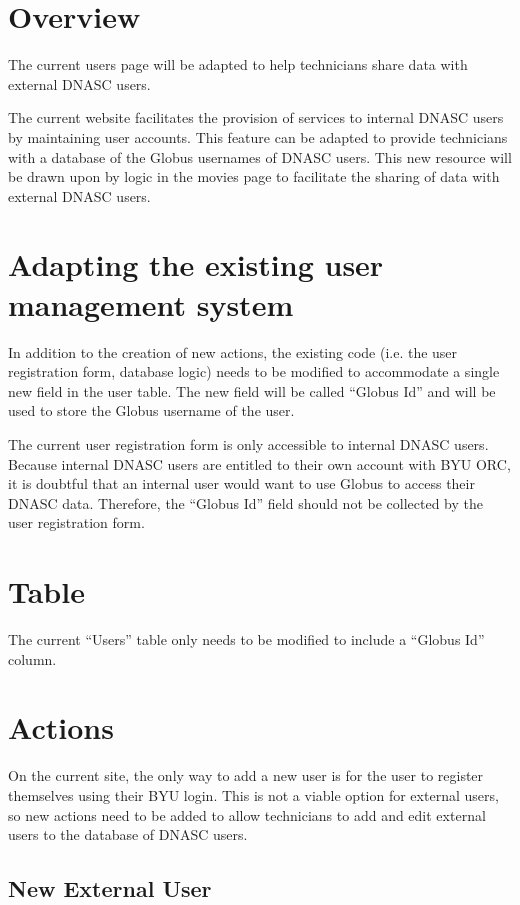 \section{Overview}

The current users page will be adapted to help technicians share data with 
external DNASC users.

The current website facilitates the provision of services to internal DNASC users 
by maintaining user accounts. This feature can be adapted to provide technicians
with a database of the Globus usernames of DNASC users. This new resource will be
drawn upon by logic in the movies page to facilitate the sharing of data with 
external DNASC users.

\section{Adapting the existing user management system}

In addition to the creation of new actions, the existing code (i.e. the user 
registration form, database logic) needs to be modified to accommodate a 
single new field in the user table. The new field will be called ``Globus Id'' and 
will be used to store the Globus username of the user.

The current user registration form is only accessible to internal DNASC users.
Because internal DNASC users are entitled to their own account with BYU ORC, it is 
doubtful that an internal user would want to use Globus to access their DNASC data. 
Therefore, the ``Globus Id'' field should not be collected by the user registration form.

\section{Table}

The current ``Users'' table only needs to be modified to include a ``Globus Id'' column.

\section{Actions}

On the current site, the only way to add a new user is for the user to register
themselves using their BYU login. This is not a viable option for external users,
so new actions need to be added to allow technicians to add and edit external users
to the database of DNASC users.

\subsection{New External User}


